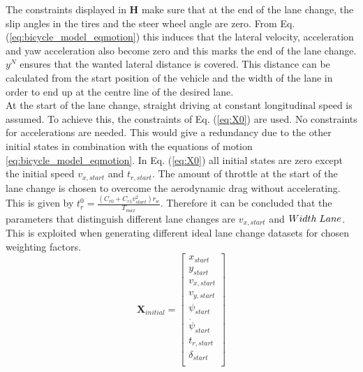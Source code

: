The constraints displayed in $\bm{H}$ make sure that at the end of the lane change, the slip angles in the tires and the steer wheel angle are zero. From Eq. (\ref{eq:bicycle_model_eqmotion}) this induces that the lateral velocity, acceleration and yaw acceleration also become zero and this marks the end of the lane change. $y^N$ ensures that the wanted lateral distance is covered. This distance can be calculated from the start position of the vehicle and the width of the lane in order to end up at the centre line of the desired lane. \\ At the start of the lane change, straight driving at constant longitudinal speed is assumed. To achieve this, the constraints of Eq. (\ref{eq:X0}) are used. No constraints for accelerations are needed. This would give a redundancy due to the other initial states in combination with the equations of motion \ref{eq:bicycle_model_eqmotion}. In Eq. (\ref{eq:X0}) all initial states are zero except the initial speed $v_{x,start}$ and $t_{r,start}$. The amount of throttle at the start of the lane change is chosen to overcome the aerodynamic drag without accelerating. This is given by $t_r^0 = \frac{(C_{r0}+C_{r1}v_{start}^2)r_w}{T_{max}}$. Therefore it can be concluded that the parameters that distinguish different lane changes are $v_{x,start}$ and $Width\hspace{1mm}Lane$. This is exploited when generating different ideal lane change datasets for chosen weighting factors. 
\newpage
\begin{equation}\label{eq:X0}
\bm{X}_{initial} =
\begin{bmatrix}
 x_{start}\\ 
 y_{start}\\
 v_{x,start}\\
 v_{y,start}\\
 \psi_{start}\\
 \dot{\psi}_{start}\\
 t_{r,start}\\
 \delta_{start}\\

\end{bmatrix}
\end{equation}


